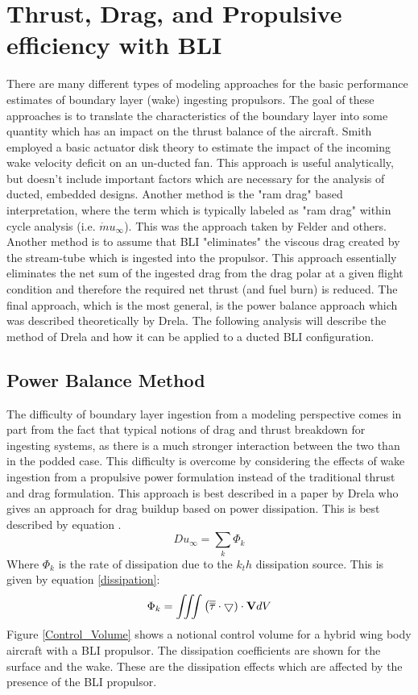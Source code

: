 \section{Thrust, Drag, and Propulsive efficiency with BLI}
\indent There are many different types of modeling approaches for the basic performance estimates of boundary layer (wake) ingesting propulsors.  The goal of these approaches is to translate the characteristics of the boundary layer into some quantity which has an impact on the thrust balance of the aircraft.  Smith employed a basic actuator disk theory to estimate the impact of the incoming wake velocity deficit on an un-ducted fan.  This approach is useful analytically, but doesn't include important factors which are necessary for the analysis of ducted, embedded designs.  Another method is the "ram drag" based interpretation, where the term which is typically labeled as "ram drag" within cycle analysis (i.e. $\dot{m}u_\infty$).  This was the approach taken by Felder and others.  Another method is to assume that BLI "eliminates" the viscous drag created by the stream-tube which is ingested into the propulsor.  This approach essentially eliminates the net sum of the ingested drag from the drag polar at a given flight condition and therefore the required net thrust (and fuel burn) is reduced.  The final approach, which is the most general, is the power balance approach which was described theoretically by Drela.  The following analysis will describe the method of Drela and how it can be applied to a ducted BLI configuration.  

\subsection{Power Balance Method}

\indent The difficulty of boundary layer ingestion from a modeling perspective comes in part from the fact that typical notions of drag and thrust breakdown for ingesting systems, as there is a much stronger interaction between the two than in the podded case.  This difficulty is overcome by considering the effects of wake ingestion from a propulsive power formulation instead of the traditional thrust and drag formulation.  This approach is best described in a paper by Drela \cite{Drela2009} who gives an approach for drag buildup based on power dissipation.  This is best described by equation \cite{Drela2009}.
   \begin{equation}Du_\infty = \displaystyle\sum_{k}\Phi_k \label{DragBuild}\end{equation}%
   Where $\Phi_k$ is the rate of dissipation due to the $k_th$ dissipation source.  This is given by equation \ref{dissipation}:
   \begin{equation} \Phi_k = \iiint{\big(\overline{\overline{\tau}} \cdot \bigtriangledown) \cdot \bold{V} dV}\label{dissipation}\end{equation}
Figure \ref{Control_Volume} shows a notional control volume for a hybrid wing body aircraft with a BLI propulsor.  The dissipation coefficients are shown for the surface and the wake.  These are the dissipation effects which are affected by the presence of the BLI propulsor.  

